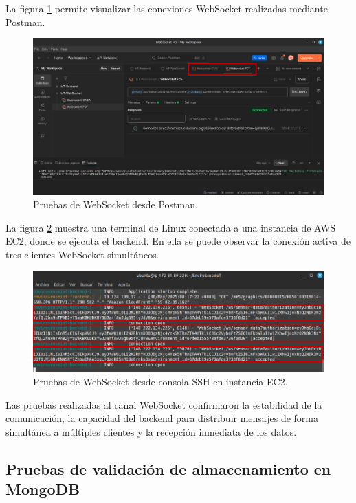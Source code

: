 La figura \ref{fig:websocket_2} permite visualizar las conexiones WebSocket
realizadas mediante Postman.

\begin{figure}[H]
    \centering
    \includegraphics[width=\textwidth]{Images/39_websocket_2.png}
    \caption[Pruebas de WebSocket en Postman]{Pruebas de WebSocket desde Postman.}
    \label{fig:websocket_2}
\end{figure}

La figura \ref{fig:websocket_3} muestra una terminal de Linux conectada a una
instancia de AWS EC2, donde se ejecuta el backend. En ella se puede observar la
conexión activa de tres clientes WebSocket simultáneos.

\begin{figure}[H]
    \centering
    \includegraphics[width=\textwidth]{Images/39_websocket_3.png}
    \caption[Pruebas de WebSocket SSH EC2]{Pruebas de WebSocket desde consola SSH en instancia EC2.}
    \label{fig:websocket_3}
\end{figure}

Las pruebas realizadas al canal WebSocket confirmaron la estabilidad de la
comunicación, la capacidad del backend para distribuir mensajes de forma
simultánea a múltiples clientes y la recepción inmediata de los datos.

\subsection{Pruebas de validación de almacenamiento en MongoDB}

